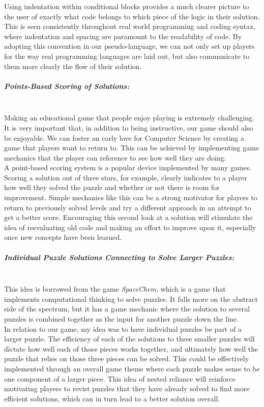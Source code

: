 Using indentation within conditional blocks provides a much clearer picture to the user of exactly what code belongs
to which piece of the logic in their solution. This is seen consistently throughout real world programming and coding
syntax, where indentation and spacing are paramount to the readability of code. By adopting this convention
in our pseudo-language, we can not only set up players for the way real programming languages are laid out, but
also communicate to them more clearly the flow of their solution.\\

\subparagraph{Points-Based Scoring of Solutions:}\mbox{} \\
Making an educational game that people enjoy playing is extremely challenging. It is very important that, in addition
to being instructive, our game should also be enjoyable. We can foster an early love for Computer Science by 
creating a game that players want to return to. This can be achieved by implementing game mechanics that the
player can reference to see how well they are doing.\\

A point-based scoring system is a popular device implemented by many games. Scoring a solution out of three stars,
for example, clearly indicates to a player how well they solved the puzzle and whether or not there is room for
improvement. Simple mechanics like this can be a strong motivator for players to return to previously solved levels
and try a different approach in an attempt to get a better score. Encouraging this second look at a solution will
stimulate the idea of reevaluating old code and making an effort to improve upon it, especially once new concepts
have been learned.\\

\subparagraph{Individual Puzzle Solutions Connecting to Solve Larger Puzzles:}\mbox{} \\
This idea is borrowed from the game \textit{SpaceChem}, which is a game that implements computational thinking
to solve puzzles. It falls more on the abstract side of the spectrum, but it has a game mechanic where the solution to
several puzzles is combined together as the input for another puzzle down the line.\\

In relation to our game, my idea was to have individual puzzles be part of a larger puzzle. The efficiency of each
of the solutions to three smaller puzzles will dictate how well each of those pieces works together, and ultimately
how well the puzzle that relies on those three pieces can be solved. This could be effectively implemented through
an overall game theme where each puzzle makes sense to be one component of a larger piece. This idea of nested
reliance will reinforce motivating players to revist puzzles that they have already solved to find more efficient solutions,
which can in turn lead to a better solution overall.\\

